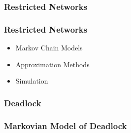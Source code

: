 \documentclass{beamer}
\begin{document}
\begin{frame}
  \frametitle{Restricted Networks}
  \begin{figure}
  
  \end{figure}
\end{frame}

\begin{frame}
  \frametitle{Restricted Networks}
  \begin{itemize}
    \item Markov Chain Models
    \item Approximation Methods
    \item Simulation
  \end{itemize}
\end{frame}



\begin{frame}
    \frametitle{Deadlock}
    \begin{figure}
    
    \end{figure}
\end{frame}

\begin{frame}
    \begin{figure}
    
    \end{figure}
\end{frame}

\begin{frame}
    \frametitle{Markovian Model of Deadlock}
    \newline
\end{frame}
\end{document}
